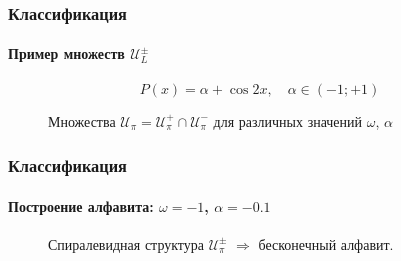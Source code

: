 \documentclass{beamer}
\begin{document}
\begin{frame}
	\frametitle{Классификация}
	\framesubtitle{Пример множеств $\mathcal{U}_L^{\pm}$}
	$$P(x) = \alpha + \cos{2x}, \quad \alpha \in (-1; +1)$$
	\begin{figure}
		\caption{Множества $\mathcal{U}_{\pi} = \mathcal{U}_{\pi}^+ \cap \mathcal{U}_{\pi}^-$ для различных значений $\omega$, $\alpha$}
		\label{pic:sets}
	\end{figure}
\end{frame}

\begin{frame}
	\frametitle{Классификация}
	\framesubtitle{Построение алфавита: $\omega = -1$, $\alpha = -0.1$}
	\begin{figure}
		\caption{Спиралевидная структура $\mathcal{U}_{\pi}^{\pm}$ $\Rightarrow$ бесконечный алфавит.}
		\label{pic:alphabet}
	\end{figure}
\end{frame}
\end{document}
